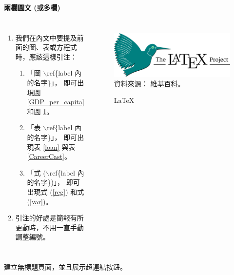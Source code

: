 \documentclass[12pt, aspectratio=169]{beamer}
\begin{document}
\linespread{1}  
\begin{frame}{\textbf{兩欄圖文 (或多欄)}}
\linespread{1.5} 

	\begin{columns}[c] %
			\begin{enumerate}[]
				\item 我們在內文中要提及前面的圖、表或方程式時，應該這樣引注：
				\begin{enumerate}[]
					\item 「圖 $\backslash$ref\{label 內的名字\}」，
						即可出現圖 \ref{GDP_per_capita} 和圖 \ref{LaTeX}。
					\item 「表 $\backslash$ref\{label 內的名字\}」，
						即可出現表 \ref{loan} 與表 \ref{CareerCast}。
					\item 「式 ($\backslash$ref\{label 內的名字\})」，
						即可出現式 (\ref{reg}) 和式 (\ref{var})。
				\end{enumerate}
				\item 引注的好處是簡報有所更動時，不用一直手動調整編號。
			\end{enumerate}

			\begin{figure}
				\includegraphics[scale=0.045]{Fig/LaTeX.png}\\
				\scriptsize{資料來源：
				\href{https://en.wikipedia.org/wiki/LaTeX}{維基百科}。}\\
				\caption{\LaTeX}
				\label{LaTeX} 
			\end{figure}
	\end{columns}
\end{frame}



\begin{frame}

	建立無標題頁面，並且展示超連結按鈕。
	
	\bigskip
	
	\hyperlink{連結的文字}{} %
	
\end{frame}
\end{document}
